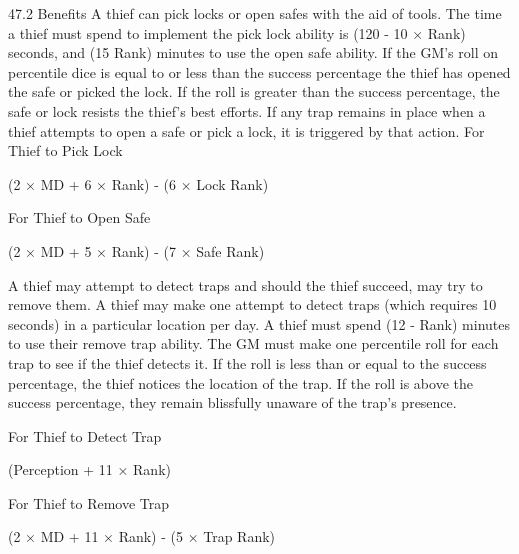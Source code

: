 \documentclass[a4paper]{article}
\begin{document}
\begin{multicols}{3}
47.2 Benefits
A thief can pick locks or open safes with the aid
of tools.
The time a thief must spend to implement the pick
lock ability is (120 - 10 × Rank) seconds, and (15 Rank) minutes to use the open safe ability.
If the GM’s roll on percentile dice is equal to or
less than the success percentage the thief has
opened the safe or picked the lock. If the roll is
greater than the success percentage, the safe or
lock resists the thief’s best efforts. If any trap remains in place when a thief attempts to open a safe
or pick a lock, it is triggered by that action.
For Thief to Pick
Lock

(2 × MD + 6 × Rank) - (6 ×
Lock Rank)

For Thief to
Open Safe

(2 × MD + 5 × Rank) - (7 ×
Safe Rank)

A thief may attempt to detect traps and should
the thief succeed, may try to remove them.
A thief may make one attempt to detect traps
(which requires 10 seconds) in a particular location
per day. A thief must spend (12 - Rank) minutes to
use their remove trap ability.
The GM must make one percentile roll for each
trap to see if the thief detects it. If the roll is less
than or equal to the success percentage, the thief
notices the location of the trap. If the roll is above
the success percentage, they remain blissfully
unaware of the trap’s presence.

For Thief to
Detect Trap

(Perception + 11 × Rank)

For Thief to
Remove Trap

(2 × MD + 11 × Rank) - (5
× Trap Rank)


\end{multicols}
\end{document}
